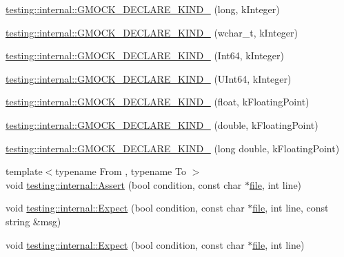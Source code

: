 \begin{DoxyCompactItemize}
\item 
\hyperlink{namespacetesting_1_1internal_a40597f856b3d94dc82e9fbbf9b027819}{testing\+::internal\+::\+G\+M\+O\+C\+K\+\_\+\+D\+E\+C\+L\+A\+R\+E\+\_\+\+K\+I\+N\+D\+\_\+} (long, k\+Integer)
\item 
\hyperlink{namespacetesting_1_1internal_af00aa2679c10ed170064e5ec5dd80e29}{testing\+::internal\+::\+G\+M\+O\+C\+K\+\_\+\+D\+E\+C\+L\+A\+R\+E\+\_\+\+K\+I\+N\+D\+\_\+} (wchar\+\_\+t, k\+Integer)
\item 
\hyperlink{namespacetesting_1_1internal_ae1d4cd9aef9a240d257364691ed3679e}{testing\+::internal\+::\+G\+M\+O\+C\+K\+\_\+\+D\+E\+C\+L\+A\+R\+E\+\_\+\+K\+I\+N\+D\+\_\+} (Int64, k\+Integer)
\item 
\hyperlink{namespacetesting_1_1internal_ae09394c3d07a5d99308fc3bbc9edc877}{testing\+::internal\+::\+G\+M\+O\+C\+K\+\_\+\+D\+E\+C\+L\+A\+R\+E\+\_\+\+K\+I\+N\+D\+\_\+} (U\+Int64, k\+Integer)
\item 
\hyperlink{namespacetesting_1_1internal_ad4ebf1b53b79ac38fbd18ccf4d63ceca}{testing\+::internal\+::\+G\+M\+O\+C\+K\+\_\+\+D\+E\+C\+L\+A\+R\+E\+\_\+\+K\+I\+N\+D\+\_\+} (float, k\+Floating\+Point)
\item 
\hyperlink{namespacetesting_1_1internal_a45748f4c08b868cb4939081769cdc7b1}{testing\+::internal\+::\+G\+M\+O\+C\+K\+\_\+\+D\+E\+C\+L\+A\+R\+E\+\_\+\+K\+I\+N\+D\+\_\+} (double, k\+Floating\+Point)
\item 
\hyperlink{namespacetesting_1_1internal_af46fdd94d8aea0da729b554de443315f}{testing\+::internal\+::\+G\+M\+O\+C\+K\+\_\+\+D\+E\+C\+L\+A\+R\+E\+\_\+\+K\+I\+N\+D\+\_\+} (long double, k\+Floating\+Point)
\item 
{\footnotesize template$<$typename From , typename To $>$ }\\void \hyperlink{namespacetesting_1_1internal_a7a259643b7f2d23ce2b757728df42c99}{testing\+::internal\+::\+Assert} (bool condition, const char $\ast$\hyperlink{_07copy_08_2_read_camera_model_8m_a151631b2fd2bb776ef06c9f440a7ed74}{file}, int line)
\item 
void \hyperlink{namespacetesting_1_1internal_ab3000fc56be000e4fa6ed7cdcfee3106}{testing\+::internal\+::\+Expect} (bool condition, const char $\ast$\hyperlink{_07copy_08_2_read_camera_model_8m_a151631b2fd2bb776ef06c9f440a7ed74}{file}, int line, const string \&msg)
\item 
void \hyperlink{namespacetesting_1_1internal_a0dfe8a755bd02aa5ea162764b61a9d97}{testing\+::internal\+::\+Expect} (bool condition, const char $\ast$\hyperlink{_07copy_08_2_read_camera_model_8m_a151631b2fd2bb776ef06c9f440a7ed74}{file}, int line)

\end{DoxyCompactItemize}
